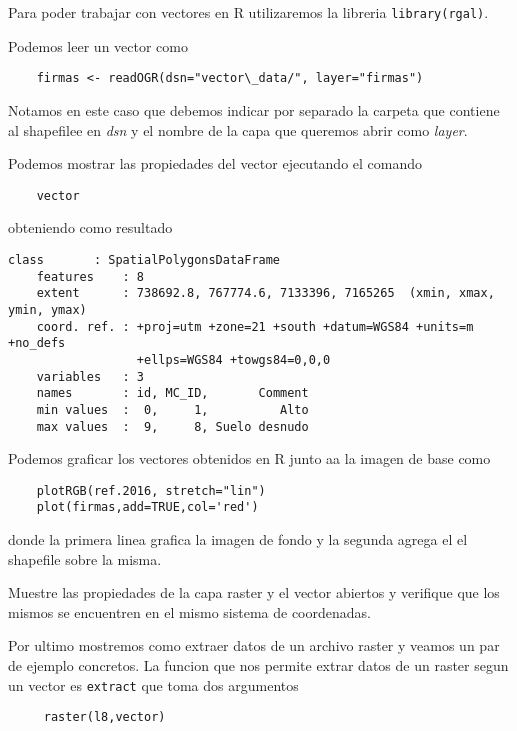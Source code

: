 Para poder trabajar con vectores en R utilizaremos la libreria
\texttt{library(rgal)}.

\begin{exa}
    Podemos leer un vector como
    \begin{lstlisting}
    firmas <- readOGR(dsn="vector\_data/", layer="firmas")
    \end{lstlisting}
    Notamos en este caso que debemos indicar por separado la carpeta que
    contiene al shapefilee en \emph{dsn} y el nombre de la capa que queremos
    abrir como \emph{layer}.

    Podemos mostrar las propiedades del vector ejecutando el comando

    \begin{lstlisting}
    vector
    \end{lstlisting}

    obteniendo como resultado
    \begin{Verbatim}[fontsize=\small]
    class       : SpatialPolygonsDataFrame 
    features    : 8 
    extent      : 738692.8, 767774.6, 7133396, 7165265  (xmin, xmax, ymin, ymax)
    coord. ref. : +proj=utm +zone=21 +south +datum=WGS84 +units=m +no_defs
                  +ellps=WGS84 +towgs84=0,0,0 
    variables   : 3
    names       : id, MC_ID,       Comment 
    min values  :  0,     1,          Alto 
    max values  :  9,     8, Suelo desnudo 
    \end{Verbatim}  

    Podemos graficar los vectores obtenidos en R junto aa la imagen de base como

    \begin{lstlisting}
    plotRGB(ref.2016, stretch="lin")
    plot(firmas,add=TRUE,col='red')
    \end{lstlisting}
    donde la primera linea grafica la imagen de fondo y la segunda agrega el
    el shapefile sobre la misma.
\end{exa}

\begin{act} 
    Muestre las propiedades de la capa raster y el vector abiertos y verifique
    que los mismos se encuentren en el mismo sistema de coordenadas.
\end{act}

Por ultimo mostremos como extraer datos de un archivo raster y veamos un par de
ejemplo concretos. La funcion que nos permite extrar datos de un raster segun
un vector es \texttt{extract} que toma dos argumentos
 \begin{lstlisting}
     raster(l8,vector)
 \end{lstlisting}

